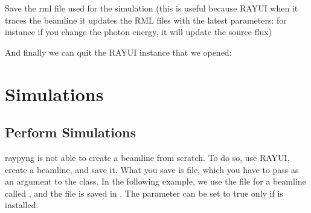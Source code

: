 \documentclass[letterpaper,10pt,english]{sphinxmanual}
\begin{document}
\sphinxAtStartPar
Save the rml file used for the simulation (this is useful because RAY\sphinxhyphen{}UI
when it traces the beamline it updates the RML files with the latest parameters: for
instance if you change the photon energy, it will update the source flux)

\begin{sphinxVerbatim}[commandchars=\\\{\}]
 \PYG{p}{[}\PYG{p}{]} 
\PYG{p}{[}\PYG{p}{]} 
\end{sphinxVerbatim}

\sphinxAtStartPar
And finally we can quit the RAY\sphinxhyphen{}UI instance that we opened:

\begin{sphinxVerbatim}[commandchars=\\\{\}]
 \PYG{p}{[}\PYG{p}{]} 
\end{sphinxVerbatim}


\section{Simulations}
\label{\detokenize{tutorial:simulations}}

\subsection{Perform Simulations}
\label{\detokenize{tutorial:perform-simulations}}
\sphinxAtStartPar
raypyng is not able to create a beamline from scratch. To do so, use RAY\sphinxhyphen{}UI,
create a beamline, and save it. What you save is  file, which you have to
pass as an argument to the  class. In the following example, we
use the file for a beamline called , and the file is saved in .
The  parameter can be set to true only if  is installed.

\begin{sphinxVerbatim}[commandchars=\\\{\}]
 
  

   
  
\end{sphinxVerbatim}
\end{document}
